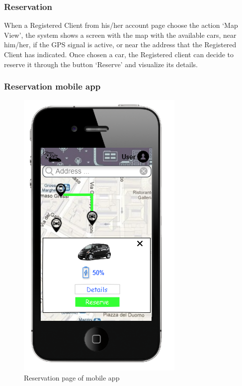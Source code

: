 \clearpage
\subsubsection{Reservation}
When a Registered Client from his/her account page choose the action ‘Map View’, the system shows a screen with the map with the available cars, near him/her, if the GPS signal is active, or near the address that the Registered Client has indicated. Once chosen a car, the Registered client can decide to reserve it through the button ‘Reserve’ and visualize its details.
\subsubsection{Reservation mobile app}
\begin{figure}[H]
\centering
\includegraphics[scale=0.8]{../images/mookup/Reservation_mobile}
\caption{Reservation page of mobile app}
\end{figure}

\clearpage
